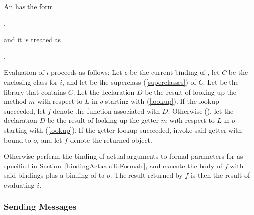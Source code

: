 \documentclass[makeidx]{article}
\begin{document}
{{

\LMHash{}%
An
has the form

\noindent
\code{\SUPER<\TypeArgumentListStd>(\ArgumentListStd)},

\noindent
and it is treated as

\noindent
{}.


\LMHash{}%
%
Evaluation of $i$ proceeds as follows:
Let $o$ be the current binding of \THIS,
let $C$ be the enclosing class for $i$,
and let \SuperClass{} be the superclass (\ref{superclasses}) of $C$.
Let  be the library that contains $C$.
%
Let the declaration $D$ be the result of looking up
the method $m$ with respect to $L$ in $o$ starting with \SuperClass{}
(\ref{lookup}).
If the lookup succeeded,
let $f$ denote the function associated with $D$.
%
Otherwise (),
let the declaration $D$ be the result of looking up
the getter $m$ with respect to $L$ in $o$ starting with \SuperClass{}
(\ref{lookup}).
If the getter lookup succeeded,
invoke said getter with \THIS{} bound to $o$,
and let $f$ denote the returned object.


\LMHash{}%
Otherwise perform the binding of actual arguments to formal parameters for
as specified in Section~\ref{bindingActualsToFormals},
and execute the body of $f$ with said bindings
plus a binding of \THIS{} to $o$.
The result returned by $f$ is then the result of evaluating $i$.

} %


\subsubsection{Sending Messages}

}
\end{document}
